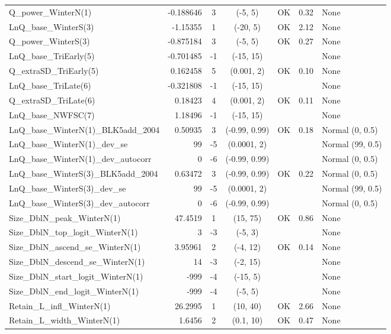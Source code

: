 \documentclass[12pt,]{article}
\begin{document}
\begin{landscape}
\begin{longtable}{lrcccll}
  Q\_power\_WinterN(1) & -0.188646 & 3 & (-5, 5) & OK & 0.32 & None \\ 
  LnQ\_base\_WinterS(3) & -1.15355 & 1 & (-20, 5) & OK & 2.12 & None \\ 
  Q\_power\_WinterS(3) & -0.875184 & 3 & (-5, 5) & OK & 0.27 & None \\ 
  LnQ\_base\_TriEarly(5) & -0.701485 & -1 & (-15, 15) &  &  & None \\ 
  Q\_extraSD\_TriEarly(5) & 0.162458 & 5 & (0.001, 2) & OK & 0.10 & None \\ 
  LnQ\_base\_TriLate(6) & -0.321808 & -1 & (-15, 15) &  &  & None \\ 
  Q\_extraSD\_TriLate(6) & 0.18423 & 4 & (0.001, 2) & OK & 0.11 & None \\ 
  LnQ\_base\_NWFSC(7) & 1.18496 & -1 & (-15, 15) &  &  & None \\ 
  LnQ\_base\_WinterN(1)\_BLK5add\_2004 & 0.50935 & 3 & (-0.99, 0.99) & OK & 0.18 & Normal (0, 0.5) \\ 
  LnQ\_base\_WinterN(1)\_dev\_se & 99 & -5 & (0.0001, 2) &  &  & Normal (99, 0.5) \\ 
  LnQ\_base\_WinterN(1)\_dev\_autocorr & 0 & -6 & (-0.99, 0.99) &  &  & Normal (0, 0.5) \\ 
  LnQ\_base\_WinterS(3)\_BLK5add\_2004 & 0.63472 & 3 & (-0.99, 0.99) & OK & 0.22 & Normal (0, 0.5) \\ 
  LnQ\_base\_WinterS(3)\_dev\_se & 99 & -5 & (0.0001, 2) &  &  & Normal (99, 0.5) \\ 
  LnQ\_base\_WinterS(3)\_dev\_autocorr & 0 & -6 & (-0.99, 0.99) &  &  & Normal (0, 0.5) \\ 
  Size\_DblN\_peak\_WinterN(1) & 47.4519 & 1 & (15, 75) & OK & 0.86 & None \\ 
  Size\_DblN\_top\_logit\_WinterN(1) & 3 & -3 & (-5, 3) &  &  & None \\ 
  Size\_DblN\_ascend\_se\_WinterN(1) & 3.95961 & 2 & (-4, 12) & OK & 0.14 & None \\ 
  Size\_DblN\_descend\_se\_WinterN(1) & 14 & -3 & (-2, 15) &  &  & None \\ 
  Size\_DblN\_start\_logit\_WinterN(1) & -999 & -4 & (-15, 5) &  &  & None \\ 
  Size\_DblN\_end\_logit\_WinterN(1) & -999 & -4 & (-5, 5) &  &  & None \\ 
  Retain\_L\_infl\_WinterN(1) & 26.2995 & 1 & (10, 40) & OK & 2.66 & None \\ 
  Retain\_L\_width\_WinterN(1) & 1.6456 & 2 & (0.1, 10) & OK & 0.47 & None \\ 

\end{longtable}
\end{landscape}
\end{document}
